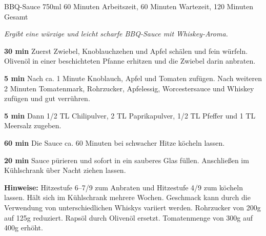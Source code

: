 \begin{recipe}{BBQ-Sauce} {750ml} {60 Minuten Arbeitszeit, 60 Minuten Wartezeit, 120 Minuten Gesamt}

\freeform
\textit{Ergibt eine würzige und leicht scharfe BBQ-Sauce mit Whiskey-Aroma.}

\textbf{30 min}
Zuerst Zwiebel, Knoblauchzehen und Apfel schälen und fein würfeln.
Olivenöl in einer beschichteten Pfanne erhitzen und die Zwiebel darin anbraten.

\textbf{5 min}
Nach ca. 1 Minute Knoblauch, Apfel und Tomaten zufügen.
Nach weiteren 2 Minuten Tomatenmark, Rohrzucker, Apfelessig, Worcestersauce und Whiskey zufügen und gut verrühren.

\textbf{5 min}
Dann 1/2 TL Chilipulver, 2 TL Paprikapulver, 1/2 TL Pfeffer und 1 TL Meersalz zugeben.

\newstep
\textbf{60 min}
Die Sauce ca. 60 Minuten bei schwacher Hitze köcheln lassen.

\newstep
\textbf{20 min}
Sauce pürieren und sofort in ein sauberes Glas füllen.
Anschließen im Kühlschrank über Nacht ziehen lassen.

\freeform
\hrulefill

\freeform
\textbf{Hinweise:}
Hitzestufe 6--7/9 zum Anbraten und Hitzestufe 4/9 zum köcheln lassen.
Hält sich im Kühlschrank mehrere Wochen.
Geschmack kann durch die Verwendung von unterschiedlichen Whiskys variiert werden.
Rohrzucker von 200g auf 125g reduziert. Rapsöl durch Olivenöl ersetzt. Tomatenmenge von 300g auf 400g erhöht.

\end{recipe}
